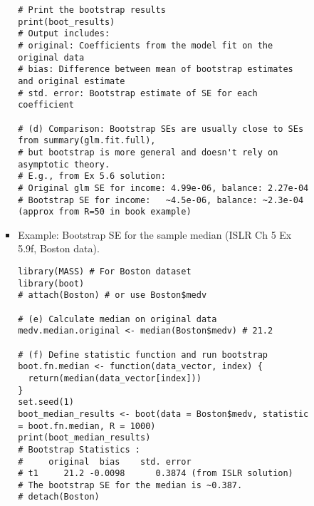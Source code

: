 \documentclass[12pt,a4paper]{article}
\begin{document}
\begin{itemize}
\begin{itemize}
\begin{itemize}
\begin{itemize}
\begin{lstlisting}[caption={Bootstrap for Logistic Regression Coefficients (ISLR Ch 5 Ex 5.6)}]
# Print the bootstrap results
print(boot_results)
# Output includes:
# original: Coefficients from the model fit on the original data
# bias: Difference between mean of bootstrap estimates and original estimate
# std. error: Bootstrap estimate of SE for each coefficient

# (d) Comparison: Bootstrap SEs are usually close to SEs from summary(glm.fit.full),
# but bootstrap is more general and doesn't rely on asymptotic theory.
# E.g., from Ex 5.6 solution:
# Original glm SE for income: 4.99e-06, balance: 2.27e-04
# Bootstrap SE for income:   ~4.5e-06, balance: ~2.3e-04 (approx from R=50 in book example)
\end{lstlisting}
            \item Example: Bootstrap SE for the sample median (ISLR Ch 5 Ex 5.9f, Boston data).
\begin{lstlisting}[caption={Bootstrap SE for Median (ISLR Ch 5 Ex 5.9f)}]
library(MASS) # For Boston dataset
library(boot)
# attach(Boston) # or use Boston$medv

# (e) Calculate median on original data
medv.median.original <- median(Boston$medv) # 21.2

# (f) Define statistic function and run bootstrap
boot.fn.median <- function(data_vector, index) {
  return(median(data_vector[index]))
}
set.seed(1)
boot_median_results <- boot(data = Boston$medv, statistic = boot.fn.median, R = 1000)
print(boot_median_results)
# Bootstrap Statistics :
#     original  bias    std. error
# t1     21.2 -0.0098      0.3874 (from ISLR solution)
# The bootstrap SE for the median is ~0.387.
# detach(Boston)
\end{lstlisting}
        \end{itemize}


\end{itemize}
\end{itemize}
\end{itemize}
\end{document}
